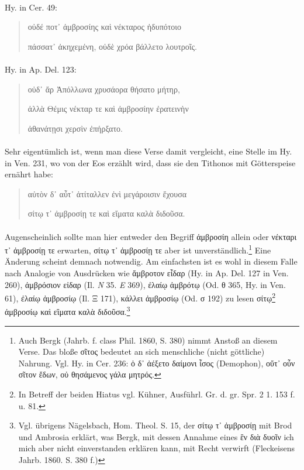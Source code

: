 \documentclass[a4paper, 11pt, oneside]{article}
\begin{document}
\paragraph{}
Hy. in Cer. 49:
\begin{quotation}\large
οὐδέ ποτ᾽ ἀμβροσίης καὶ νέκταρος ἡδυπότοιο

πάσσατ᾽ ἀκηχεμένη, οὐδὲ χρόα βάλλετο λουτροῖς.
\end{quotation}
\paragraph{}
Hy. in Ap. Del. 123:
\begin{quotation}\large
οὐδ᾽ ἄρ Ἀπόλλωνα χρυσάορα θήσατο μήτηρ,

ἀλλὰ Θέμις νέκταρ τε καὶ ἀμβροσίην ἐρατεινὴν

ἀθανάτῃσι χερσὶν ἐπήρξατο.
\end{quotation}
\paragraph{}
Sehr eigentümlich ist, wenn man diese Verse damit vergleicht, eine Stelle im Hy. in Ven. 231, wo von der Eos erzählt wird, dass sie den Tithonos mit Götterspeise ernährt habe:
\begin{quotation}\large
αὐτὸν δ᾽ αὖτ᾽ ἀτίταλλεν ἐνὶ μεγάροισιν ἔχουσα

σίτῳ τ᾿ ἀμβροσίῃ τε καὶ εἴματα καλὰ διδοῦσα.
\end{quotation}
\paragraph{}
Augenscheinlich sollte man hier entweder den Begriff ἀμβροσίη allein oder νέκταρι τ᾽ ἀμβροσίῃ τε erwarten, σίτῳ τ᾽ ἀμβροσίῃ τε aber ist unverständlich.\footnote{Auch Bergk (Jahrb. f. class Phil. 1860, S. 380) nimmt Anstoß an diesem Verse. Das bloße σῖτος bedeutet an sich menschliche (nicht göttliche) Nahrung. Vgl. Hy. in Cer. 236: ὁ δ᾽ ἀέξετο δαίμονι ἶσος (Demophon), οὔτ᾽ οὖν σῖτον ἔδων, οὐ θησάμενος γάλα μητρός.} Eine Änderung scheint demnach notwendig. Am einfachsten ist es wohl in diesem Falle nach Analogie von Ausdrücken wie ἄμβροτον εἶδαρ (Hy. in Ap. Del. 127 in Ven. 260), ἀμβρόσιον εἰδαρ (Il. \emph{N} 35. \emph{E} 369), ἐλαίῳ ἀμβρότῳ (Od. θ 365, Hy. in Ven. 61), ἐλαίῳ ἀμβροσίῳ (Il. Ξ 171), κάλλει ἀμβροσίῳ (Od. σ 192) zu lesen σίτῳ\footnote{In Betreff der beiden Hiatus vgl. Kühner, Ausführl. Gr. d. gr. Spr. 2 1. 153 f. u. 81.} ἀμβροσίῳ καὶ εἳματα καλὰ διδοῦσα.\footnote{Vgl. übrigens Nägelsbach, Hom. Theol. S. 15, der σίτῳ τ᾽ ἀμβροσίῃ mit Brod und Ambrosia erklärt, was Bergk, mit dessen Annahme eines ἓν διὰ δυοῖν ich mich aber nicht einverstanden erklären kann, mit Recht verwirft (Fleckeisens Jahrb. 1860. S. 380 f.)}
\end{document}
